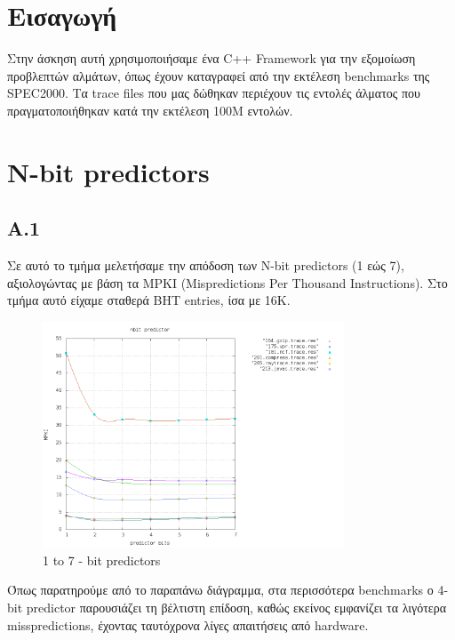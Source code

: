 \documentclass[a4paper,10pt]{article}
\begin{document}
\def\thesection {\roman{section}: }
\def\thesubsection {\Roman{subsection}) }



\section*{Εισαγωγή}

Στην άσκηση αυτή χρησιμοποιήσαμε ένα C++ Framework για την εξομοίωση
προβλεπτών αλμάτων,
όπως έχουν καταγραφεί από την εκτέλεση benchmarks της SPEC2000. Τα
trace files που μας δώθηκαν περιέχουν τις εντολές άλματος που πραγματοποιήθηκαν κατά την
εκτέλεση 100M εντολών.


\section*{Ν-bit predictors}


\subsection*{A.1}
Σε αυτό το τμήμα μελετήσαμε την απόδοση των Ν-bit predictors (1 εώς 7),
αξιολογώντας με βάση τα MPKI (Mispredictions Per
Thousand Instructions). Στο τμήμα αυτό είχαμε σταθερά BHT entries, ίσα με 16Κ.


\begin{figure}[H]
	\centering
	\includegraphics[width=0.8\textwidth]{../Results/part1/results_A1.png}
	\caption{1 to 7 - bit predictors}
\end{figure}


Όπως παρατηρούμε από το παραπάνω διάγραμμα, στα
περισσότερα benchmarks ο 4-bit predictor παρουσιάζει τη βέλτιστη επίδοση,
καθώς εκείνος εμφανίζει τα λιγότερα misspredictions, έχοντας ταυτόχρονα λίγες
απαιτήσεις από hardware.
\end{document}
